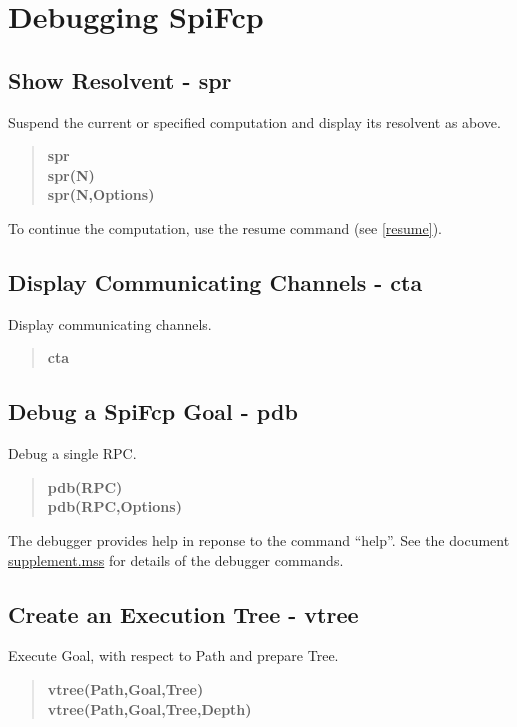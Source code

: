 \documentclass[twoside,10pt]{report}
\begin{document}
\section{Debugging SpiFcp}

\subsection{Show Resolvent - spr}
\label{spr}

Suspend the current or specified computation and display its resolvent
as above.

\begin{verse}
 {\bfseries
   spr \\
   spr(N) \\
   spr(N,Options)
 }
\end{verse}

\noindent
To continue the computation, use the resume command
(see \ref{resume}).

\subsection{Display Communicating Channels - cta}
\label{cta}

Display communicating channels.

\begin{verse}
 {\bfseries
    cta
 }
\end{verse}

\subsection{Debug a SpiFcp Goal - pdb}

Debug a single RPC.

\begin{verse}
 {\bfseries
    pdb(RPC) \\
    pdb(RPC,Options)
 }
\end{verse}

\noindent
The debugger provides help in reponse to the command ``help''.
See the document \underline{supplement.mss} for details of the debugger
commands.

\subsection{Create an Execution Tree - vtree}

Execute Goal, with respect to Path and prepare Tree.

\begin{verse}
 {\bfseries
    vtree(Path,Goal,Tree) \\
    vtree(Path,Goal,Tree,Depth)
 }
\end{verse}
\end{document}
